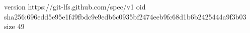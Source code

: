 version https://git-lfs.github.com/spec/v1
oid sha256:696edd5e95e1f49fbdc9e9edb6c0935bf2474eeb9fc68d1b6b2425444a9f3b03
size 49
